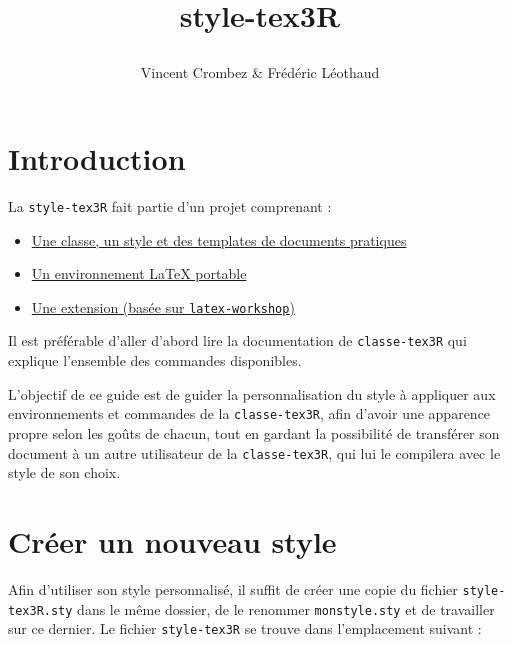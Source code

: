 \documentclass{classe-tex3R}
\title{\bfseries style-tex3R\par}
\author{Vincent Crombez \& Frédéric Léothaud}
\date{}
\begin{document}
\maketitle

\newpage

\tableofcontents

\newpage

{}
\section*{Introduction}

La \texttt{style-tex3R} fait partie d'un projet comprenant :
%
\begin{itemize}
  \item \href{https://github.com/Tex3rivieres/TeX3R-ClasseStyle}{Une classe, un style et des templates de documents pratiques}
  \item \href{https://github.com/Tex3rivieres/TeX3R-Portable}{Un environnement LaTeX portable}
  \item \href{https://github.com/Tex3rivieres/TeX3R-Workshop}{Une extension (basée sur \texttt{latex-workshop})}
\end{itemize}

Il est préférable d'aller d'abord lire la documentation de \texttt{classe-tex3R} qui explique l'ensemble des commandes disponibles. 

L'objectif de ce guide est de guider la personnalisation du style à appliquer aux environnements et commandes de la \texttt{classe-tex3R}, afin d'avoir une apparence propre selon les goûts de chacun, tout en gardant la possibilité de transférer son document à un autre utilisateur de la \texttt{classe-tex3R}, qui lui le compilera avec le style de son choix.

\newpage

\section{Créer un nouveau style}

Afin d'utiliser son style personnalisé, il suffit de créer une copie du fichier \texttt{style-tex3R.sty} dans le même dossier, de le renommer \texttt{monstyle.sty} et de travailler sur ce dernier. Le fichier \texttt{style-tex3R} se trouve dans l'emplacement suivant :


\end{document}
